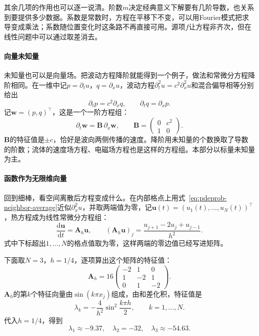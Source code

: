 其余几项的作用也可以逐一说清。阶数$m$决定经典意义下解要有几阶导数，也关系到要提供多少数据。系数是常数时，方程在平移下不变，可以用Fourier模式把求导变成乘法；系数随位置变化时这条路不再直接可用。源项$f$让方程非齐次，但在线性问题中可以通过取差消去。

\paragraph{向量未知量}
未知量也可以是向量场。把波动方程降阶就能得到一个例子，做法和常微分方程降阶相同。在一维中记$p=\partial_tu$，$q=\partial_xu$，波动方程$\partial_t^{2}u=c^{2}\partial_x^{2}u$和混合偏导相等分别给出
\[
  \partial_tp=c^{2}\partial_xq,\qquad \partial_tq=\partial_xp.
\]
记$\bm{w}=(p,q)^{\top}$，这是一个一阶方程组：
\begin{equation}
  \partial_t\bm{w}=\bm{B}\,\partial_x\bm{w},\qquad
  \bm{B}=\begin{pmatrix}0&c^{2}\\1&0\end{pmatrix}.
  \label{eq:pdeprob-first-order-system}
\end{equation}
$\bm{B}$的特征值是$\pm c$，恰好是波向两侧传播的速度。降阶用未知量的个数换取了导数的阶数；流体的速度场方程、电磁场方程也是这样的方程组。本部分以标量未知量为主。

\paragraph{函数作为无限维向量}
回到细棒，看空间离散后方程变成什么。在内部格点上用式~\eqref{eq:pdeprob-neighbor-average}近似$\partial_x^{2}u$，并取两端值为零，记$\bm{u}(t)=(u_1(t),\ldots,u_N(t))^{\top}$，热方程成为线性常微分方程组：
\begin{equation}
  \frac{\mathrm{d}\bm{u}}{\mathrm{d}t}=\bm{A}_h\bm{u},\qquad
  (\bm{A}_h\bm{u})_j=\frac{u_{j+1}-2u_j+u_{j-1}}{h^{2}}.
  \label{eq:pdeprob-semi-discrete}
\end{equation}
式中下标超出$1,\ldots,N$的格点值取为零，这样两端的零边值已经写进矩阵。

下面取$N=3$，$h=1/4$，逐项算出这个矩阵的特征值：
\[
  \bm{A}_h=16\begin{pmatrix}-2&1&0\\1&-2&1\\0&1&-2\end{pmatrix}.
\]
$\bm{A}_h$的第$k$个特征向量由$\sin(k\pi x_j)$组成，由和差化积，特征值是
\[
  \lambda_k=-\frac{4}{h^{2}}\sin^{2}\frac{k\pi h}{2},\qquad k=1,\ldots,N.
\]
代入$h=1/4$，得到
\[
  \lambda_1\approx-9.37,\quad \lambda_2=-32,\quad \lambda_3\approx-54.63.
\]

